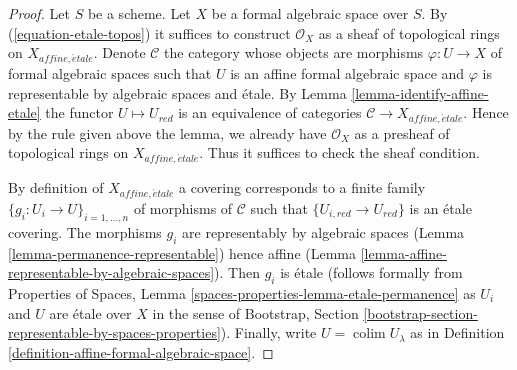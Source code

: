 \documentclass{stacks-project}
\theoremstyle{plain}
\theoremstyle{definition}
\theoremstyle{remark}
\numberwithin{equation}{subsection}
\def\colim{\mathop{\mathrm{colim}}\nolimits}
\def\etale{{\acute{e}tale}}
\begin{document}
\begin{proof}
Let $S$ be a scheme. Let $X$ be a formal algebraic space over $S$.
By (\ref{equation-etale-topos}) it suffices to construct $\mathcal{O}_X$
as a sheaf of topological rings on $X_{affine, \etale}$.
Denote $\mathcal{C}$ the category whose objects
are morphisms $\varphi : U \to X$ of formal algebraic spaces such that
$U$ is an affine formal algebraic space and
$\varphi$ is representable by algebraic spaces and \'etale.
By Lemma \ref{lemma-identify-affine-etale}
the functor $U \mapsto U_{red}$ is an equivalence of categories
$\mathcal{C} \to X_{affine, \etale}$. Hence by the rule given
above the lemma, we already have $\mathcal{O}_X$ as a presheaf of
topological rings on $X_{affine, \etale}$. Thus it suffices to check
the sheaf condition.

\medskip\noindent
By definition of $X_{affine, \etale}$ a covering corresponds to a finite
family $\{g_i : U_i \to U\}_{i = 1, \ldots, n}$ of morphisms of $\mathcal{C}$
such that $\{U_{i, red} \to U_{red}\}$ is an \'etale covering.
The morphisms $g_i$ are representably by algebraic spaces
(Lemma \ref{lemma-permanence-representable}) hence affine
(Lemma \ref{lemma-affine-representable-by-algebraic-spaces}).
Then $g_i$ is \'etale (follows formally from
Properties of Spaces, Lemma \ref{spaces-properties-lemma-etale-permanence}
as $U_i$ and $U$ are \'etale over $X$ in the sense of
Bootstrap, Section \ref{bootstrap-section-representable-by-spaces-properties}).
Finally, write $U = \colim U_\lambda$ as in
Definition \ref{definition-affine-formal-algebraic-space}.


\end{proof}
\end{document}
